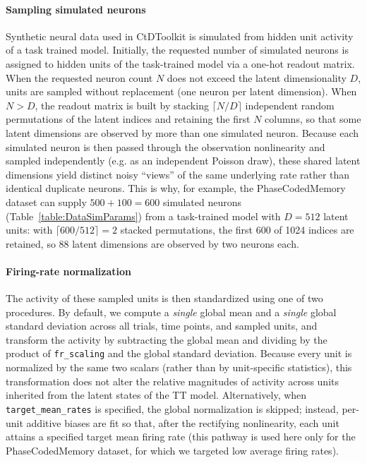 \documentclass{article}
\begin{document}
\paragraph{Sampling simulated neurons}
Synthetic neural data used in CtDToolkit is simulated from hidden unit activity of a task trained model. Initially, the requested number of simulated neurons is assigned to hidden units of the task-trained model via a one-hot readout matrix. When the requested neuron count $N$ does not exceed the latent dimensionality $D$, units are sampled without replacement (one neuron per latent dimension). When $N > D$, the readout matrix is built by stacking $\lceil N/D \rceil$ independent random permutations of the latent indices and retaining the first $N$ columns, so that some latent dimensions are observed by more than one simulated neuron. Because each simulated neuron is then passed through the observation nonlinearity and sampled independently (e.g. as an independent Poisson draw), these shared latent dimensions yield distinct noisy ``views'' of the same underlying rate rather than identical duplicate neurons. This is why, for example, the PhaseCodedMemory dataset can supply $500 + 100 = 600$ simulated neurons (Table~\ref{table:DataSimParams}) from a task-trained model with $D = 512$ latent units: with $\lceil 600/512 \rceil = 2$ stacked permutations, the first 600 of 1024 indices are retained, so 88 latent dimensions are observed by two neurons each.

\paragraph{Firing-rate normalization}
The activity of these sampled units is then standardized using one of two procedures. By default, we compute a \emph{single} global mean and a \emph{single} global standard deviation across all trials, time points, and sampled units, and transform the activity by subtracting the global mean and dividing by the product of \texttt{fr\_scaling} and the global standard deviation. Because every unit is normalized by the same two scalars (rather than by unit-specific statistics), this transformation does not alter the relative magnitudes of activity across units inherited from the latent states of the TT model. Alternatively, when \texttt{target\_mean\_rates} is specified, the global normalization is skipped; instead, per-unit additive biases are fit so that, after the rectifying nonlinearity, each unit attains a specified target mean firing rate (this pathway is used here only for the PhaseCodedMemory dataset, for which we targeted low average firing rates).
\end{document}
